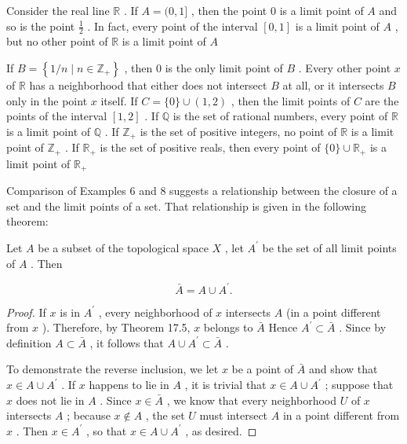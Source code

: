 \begin{example} Consider the real line \(\mathbb{R}\) . If \(A = (0,1\rbrack\) , then the point 0 is a limit point of \(A\) and so is the point \(\frac{1}{2}\) . In fact, every point of the interval \(\left\lbrack  {0,1}\right\rbrack\) is a limit point of \(A\) , but no other point of \(\mathbb{R}\) is a limit point of \(A\)

If \(B = \left\{  {1/n \mid  n \in  {\mathbb{Z}}_{ + }}\right\}\) , then 0 is the only limit point of \(B\) . Every other point \(x\) of \(\mathbb{R}\) has a neighborhood that either does not intersect \(B\) at all, or it intersects \(B\) only in the point \(x\) itself. If \(C = \{ 0\}  \cup  \left( {1,2}\right)\) , then the limit points of \(C\) are the points of the interval \(\left\lbrack  {1,2}\right\rbrack\) . If \(\mathbb{Q}\) is the set of rational numbers, every point of \(\mathbb{R}\) is a limit point of \(\mathbb{Q}\) . If \({\mathbb{Z}}_{ + }\) is the set of positive integers, no point of \(\mathbb{R}\) is a limit point of \({\mathbb{Z}}_{ + }\) . If \({\mathbb{R}}_{ + }\) is the set of positive reals, then every point of \(\{ 0\}  \cup  {\mathbb{R}}_{ + }\) is a limit point of \({\mathbb{R}}_{ + }\)
\end{example}

Comparison of Examples 6 and 8 suggests a relationship between the closure of a set and the limit points of a set. That relationship is given in the following theorem:

\begin{theorem} Let \(A\) be a subset of the topological space \(X\) , let \({A}^{\prime }\) be the set of all limit points of \(A\) . Then

\[
\bar{A} = A \cup  {A}^{\prime }.
\]

\end{theorem}
\begin{proof}
If \(x\) is in \({A}^{\prime }\) , every neighborhood of \(x\) intersects \(A\) (in a point different from \(x\) ). Therefore, by Theorem 17.5, \(x\) belongs to \(\bar{A}\) Hence \({A}^{\prime } \subset  \bar{A}\) . Since by definition \(A \subset  \bar{A}\) , it follows that \(A \cup  {A}^{\prime } \subset  \bar{A}\) .

To demonstrate the reverse inclusion, we let \(x\) be a point of \(\bar{A}\) and show that \(x \in  A \cup  {A}^{\prime }\) . If \(x\) happens to lie in \(A\) , it is trivial that \(x \in  A \cup  {A}^{\prime }\) ; suppose that \(x\) does not lie in \(A\) . Since \(x \in  \bar{A}\) , we know that every neighborhood \(U\) of \(x\) intersects \(A\) ; because \(x \notin  A\) , the set \(U\) must intersect \(A\) in a point different from \(x\) . Then \(x \in  {A}^{\prime }\) , so that \(x \in  A \cup  {A}^{\prime }\) , as desired.
\end{proof}


